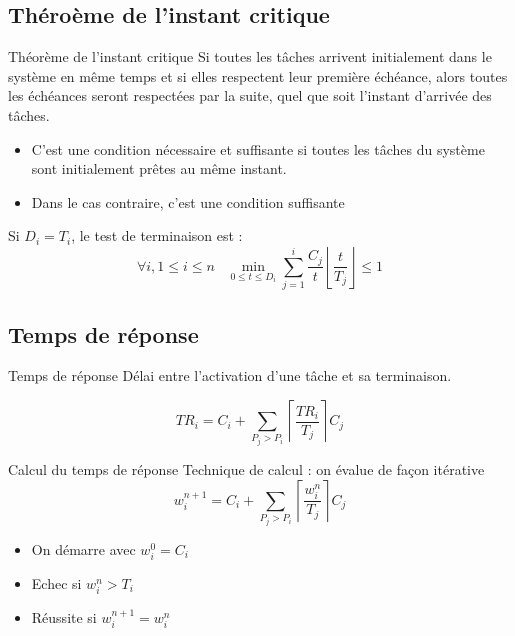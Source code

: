 \subsection{Théroème de l'instant critique}

\begin{frame}{Théorème de l'instant critique}
  Si toutes les  tâches arrivent initialement dans le  système en même
  temps et  si elles respectent  leur première échéance,  alors toutes
  les  échéances  seront  respectées  par  la  suite,  quel  que  soit
  l'instant d'arrivée des tâches.

  \begin{itemize}
  \item  C'est une condition  nécessaire et  suffisante si  toutes les
    tâches du système sont initialement prêtes au même instant.
  \item Dans le cas contraire, c'est une condition suffisante
  \end{itemize}

  Si $D_i = T_i$, le test de terminaison est :
  $$\forall i, 1 ≤ i ≤ n \;\;\;\min_{0 ≤ t ≤ D_i}
  \sum_{j=1}^i\frac{C_j}{t}
  \left\lfloor\frac{t}{T_j}\right\rfloor ≤ 1$$
\end{frame}

\subsection{Temps de réponse}

\begin{frame}{Temps de réponse}
  Délai entre l'activation d'une tâche et sa terminaison. 

  $$TR_i = C_i + \sum_{P_j > P_i} \left\lceil\frac{TR_i}{T_j}\right\rceil C_j$$

\end{frame}

\begin{frame}{Calcul du temps de réponse}
  Technique de calcul : on évalue de façon itérative
  $$w_i^{n+1}=C_i+\sum_{P_j > P_i} \left\lceil\frac{w_i^n}{T_j}\right\rceil C_j$$

  \begin{itemize}
    \item On démarre avec $w_i^0 = C_i$
    \item Echec si $w_i^n > T_i$
    \item Réussite si $w_i^{n+1} = w_i^n$
  \end{itemize}
\end{frame} 

